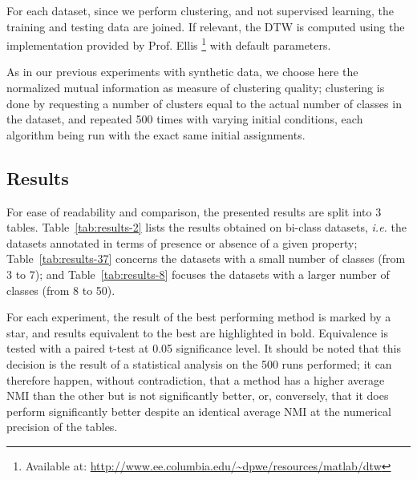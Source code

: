 \documentclass[10pt,journal,compsoc]{IEEEtran}
\begin{document}
For each dataset, since we perform clustering, and not supervised learning, the training and testing data are joined. If relevant, the DTW is computed using the implementation provided by Prof. Ellis \footnote{Available at: \url{http://www.ee.columbia.edu/~dpwe/resources/matlab/dtw}} with default parameters.

As in our previous experiments with synthetic data, we choose here the normalized mutual information as measure of clustering quality; clustering is done by requesting a number of clusters equal to the actual number of classes in the dataset, and repeated 500 times with varying initial conditions, each algorithm being run with the exact same initial assignments.

\subsection{Results}

For ease of readability and comparison, the presented results are split into 3 tables. Table~\ref{tab:results-2} lists the results obtained on bi-class datasets, \textit{i.e.} the datasets annotated in terms of presence or absence of a given property; Table~\ref{tab:results-37} concerns the datasets with a small number of classes (from 3 to 7); and Table~\ref{tab:results-8} focuses the datasets with a larger number of classes (from 8 to 50).

For each experiment, the result of the best performing method is marked by a star, and results equivalent to the best are highlighted in bold. Equivalence is tested with a paired t-test at 0.05 significance level. It should be noted that this decision is the result of a statistical analysis on the 500 runs performed; it can therefore happen, without contradiction, that a method has a higher average NMI than the other but is not significantly better, or, conversely, that it does perform significantly better despite an identical average NMI at the numerical precision of the tables.

\end{document}

